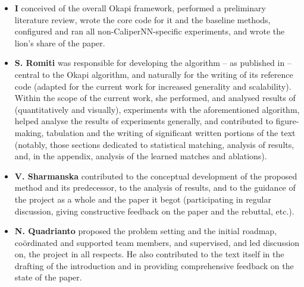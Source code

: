 %
{\renewcommand\labelitemi{}
%
\begin{itemize}
  \item 
    \textbf{I} conceived of the overall Okapi framework, performed a preliminary literature review,
    wrote the core code for it and the baseline methods, configured and ran all
    non-CaliperNN-specific experiments, and wrote the lion's share of the paper.
  \item 
    \textbf{S. Romiti} was responsible for developing the \CNN{} algorithm -- as published in
    \citet{RomInsShaQua22} -- central to the Okapi algorithm, and naturally for the writing of its
    reference code (adapted for the current work for increased generality and scalability).
    Within the scope of the current work, she performed, and analysed results of (quantitatively
    and visually), experiments with the aforementioned \CNN{} algorithm,  helped analyse the
    results of experiments generally, and contributed to figure-making, tabulation and the writing
    of significant written portions of the text (notably, those sections dedicated to statistical
    matching, analysis of results, and, in the appendix, analysis of the learned matches and
    \CNN{} ablations).
  \item 
    \textbf{V. Sharmanska} contributed to the conceptual development of the proposed method and its
    predecessor, to the analysis of results, and to the guidance of the project as a whole and the
    paper it begot (participating in regular discussion, giving constructive feedback on the paper
    and the rebuttal, etc.).
  \item 
    \textbf{N. Quadrianto} proposed the problem setting and the initial roadmap, co\"ordinated and
    supported team members, and supervised, and led discussion on, the project in all respects.
    He also contributed to the text itself in the drafting of the introduction and in providing
    comprehensive feedback on the state of the paper.
\end{itemize}
%
}
